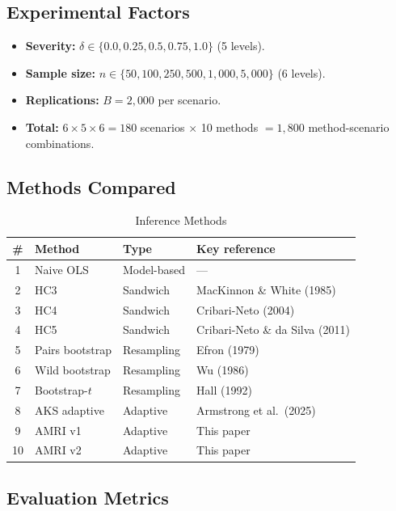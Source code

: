 \documentclass[12pt]{article}
\theoremstyle{definition}
\theoremstyle{remark}
\begin{document}
\subsection{Experimental Factors}

\begin{itemize}[nosep]
\item \textbf{Severity:} $\delta \in \{0.0, 0.25, 0.5, 0.75, 1.0\}$ (5 levels).
\item \textbf{Sample size:} $n \in \{50, 100, 250, 500, 1{,}000, 5{,}000\}$ (6 levels).
\item \textbf{Replications:} $B = 2{,}000$ per scenario.
\item \textbf{Total:} $6 \times 5 \times 6 = 180$ scenarios $\times$ 10 methods $= 1{,}800$ method-scenario combinations.
\end{itemize}

\subsection{Methods Compared}

\begin{table}[H]
\centering
\caption{Inference Methods}
\label{tab:methods}
\small
\begin{tabular}{clll}
\toprule
\# & Method & Type & Key reference \\
\midrule
1 & Naive OLS & Model-based & --- \\
2 & HC3 & Sandwich & MacKinnon \& White (1985) \\
3 & HC4 & Sandwich & Cribari-Neto (2004) \\
4 & HC5 & Sandwich & Cribari-Neto \& da Silva (2011) \\
5 & Pairs bootstrap & Resampling & Efron (1979) \\
6 & Wild bootstrap & Resampling & Wu (1986) \\
7 & Bootstrap-$t$ & Resampling & Hall (1992) \\
8 & AKS adaptive & Adaptive & Armstrong et al.\ (2025) \\
9 & AMRI v1 & Adaptive & This paper \\
10 & AMRI v2 & Adaptive & This paper \\
\bottomrule
\end{tabular}
\end{table}

\subsection{Evaluation Metrics}
\end{document}
